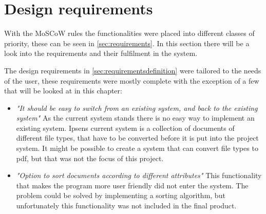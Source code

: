 \section{Design requirements}\label{sec:disdesignrequirements}
With the MoSCoW rules the functionalities were placed into different classes of priority, these can be seen in \cref{sec:requirements}.
In this section there will be a look into the requirements and their fulfilment in the system.

The design requirements in \cref{sec:requirementsdefinition} were tailored to the needs of the user, these requirements were mostly complete with the exception of a few that will be looked at in this chapter:

\begin{itemize}
	\item \textit{"It should be easy to switch from an existing system, and back to the existing system"}
	As the current system stands there is no easy way to implement an existing system.
Ipsens current system is a collection of documents of different file types, that have to be converted before it is put into the project system.
It might be possible to create a system that can convert file types to pdf, but that was not the focus of this project.
	\item \textit{"Option to sort documents according to different attributes"}
	This functionality that makes the program more user friendly did not enter the system.
The problem could be solved by implementing a sorting algorithm, but unfortunately this functionality was not included in the final product.
\end{itemize}


